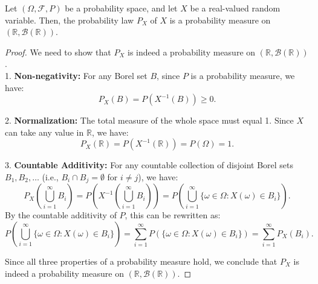 \begin{center}
\end{center}

\begin{theorem}
    Let \((\Omega, \mathcal{F}, P)\) be a probability space, and let \(X\) be a real-valued random variable. Then, the probability law \(P_X\) of \(X\) is a probability measure on \((\mathbb{R}, \mathcal{B}(\mathbb{R}))\).
\end{theorem}

\begin{proof}
We need to show that \(P_X\) is indeed a probability measure on \((\mathbb{R}, \mathcal{B}(\mathbb{R}))\). \\

1. \textbf{Non-negativity:} For any Borel set \(B\), since \(P\) is a probability measure, we have:
   \[
   P_X(B) = P(X^{-1}(B)) \geq 0.
   \]

2. \textbf{Normalization:} The total measure of the whole space must equal 1. Since \(X\) can take any value in \(\mathbb{R}\), we have:
   \[
   P_X(\mathbb{R}) = P(X^{-1}(\mathbb{R})) = P(\Omega) = 1.
   \]

3. \textbf{Countable Additivity:} For any countable collection of disjoint Borel sets \(B_1, B_2, \ldots\) (i.e., \(B_i \cap B_j = \emptyset\) for \(i \neq j\)), we have:
   \[
   P_X\left(\bigcup_{i=1}^\infty B_i\right) = P(X^{-1}(\bigcup_{i=1}^\infty B_i)) = P\left(\bigcup_{i=1}^\infty \{ \omega \in \Omega : X(\omega) \in B_i \}\right).
   \]
   By the countable additivity of \(P\), this can be rewritten as:
   \[
   P\left(\bigcup_{i=1}^\infty \{ \omega \in \Omega : X(\omega) \in B_i \}\right) = \sum_{i=1}^\infty P\left(\{ \omega \in \Omega : X(\omega) \in B_i \}\right) = \sum_{i=1}^\infty P_X(B_i).
   \]

Since all three properties of a probability measure hold, we conclude that \(P_X\) is indeed a probability measure on \((\mathbb{R}, \mathcal{B}(\mathbb{R}))\). 
\end{proof}

